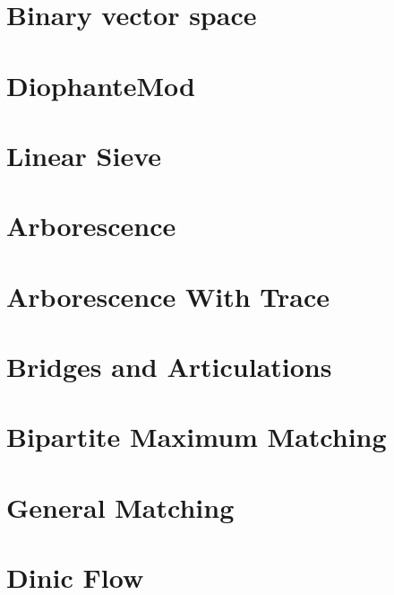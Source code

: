 \section{Binary vector space}
\raggedbottom
\hrulefill

\section{DiophanteMod}
\raggedbottom
\hrulefill

\section{Linear Sieve}
\raggedbottom
\hrulefill

\section{Arborescence}
\raggedbottom
\hrulefill

\section{Arborescence With Trace}
\raggedbottom
\hrulefill

\section{Bridges and Articulations}
\raggedbottom
\hrulefill

\section{Bipartite Maximum Matching}
\raggedbottom
\hrulefill

\section{General Matching}
\raggedbottom
\hrulefill

\section{Dinic Flow}
\raggedbottom
\hrulefill

